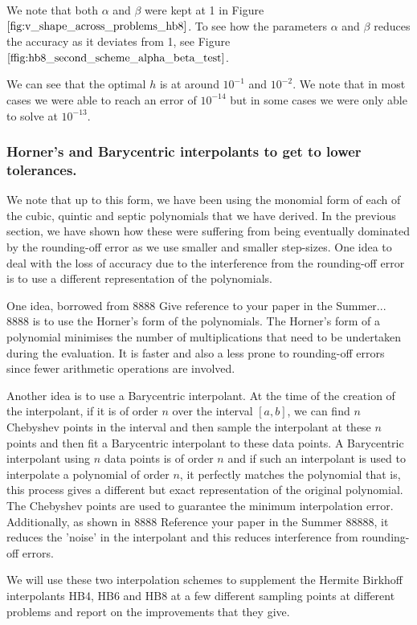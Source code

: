 \documentclass{article}
\begin{document}
We note that both $\alpha$ and $\beta$ were kept at 1 in Figure $\ref{fig:v_shape_across_problems_hb8}$. To see how the parameters $\alpha$ and $\beta$ reduces the accuracy as it deviates from 1, see Figure $\ref{ffig:hb8_second_scheme_alpha_beta_test}$.

We can see that the optimal $h$ is at around $10^{-1}$ and $10^{-2}$. We note that in most cases we were able to reach an error of $10^{-14}$ but in some cases we were only able to solve at $10^{-13}$. 

\subsubsection{Horner's and Barycentric interpolants to get to lower tolerances.}
We note that up to this form, we have been using the monomial form of each of the cubic, quintic and septic polynomials that we have derived. In the previous section, we have shown how these were suffering from being eventually dominated by the rounding-off error as we use smaller and smaller step-sizes. One idea to deal with the loss of accuracy due to the interference from the rounding-off error is to use a different representation of the polynomials. 

One idea, borrowed from 8888 Give reference to your paper in the Summer... 8888 is to use the Horner's form of the polynomials. The Horner's form of a polynomial minimises the number of multiplications that need to be undertaken during the evaluation. It is faster and also a less prone to rounding-off errors since fewer arithmetic operations are involved.

Another idea is to use a Barycentric interpolant. At the time of the creation of the interpolant, if it is of order $n$ over the interval $[a, b]$, we can find $n$ Chebyshev points in the interval and then sample the interpolant at these $n$ points and then fit a Barycentric interpolant to these data points. A Barycentric interpolant using $n$ data points is of order $n$ and if such an interpolant is used to interpolate a polynomial of order $n$, it perfectly matches the polynomial that is, this process gives a different but exact representation of the original polynomial. The Chebyshev points are used to guarantee the minimum interpolation error. Additionally, as shown in 8888 Reference your paper in the Summer 88888, it reduces the 'noise' in the interpolant and this reduces interference from rounding-off errors.

We will use these two interpolation schemes to supplement the Hermite Birkhoff interpolants HB4, HB6 and HB8 at a few different sampling points at different problems and report on the improvements that they give.
\end{document}
